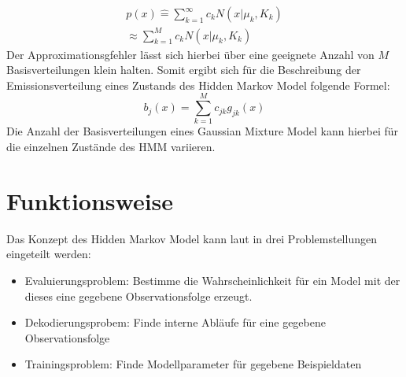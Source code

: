 \begin{multline}
p(x) \hat{=} \sum_{k=1}^\infty c_{k} N(x|\mu_{k},K_{k})\\
\approx \sum_{k=1}^M c_{k} N(x|\mu_{k},K_{k})  
\end{multline}
Der Approximationsgfehler lässt sich hierbei über eine geeignete Anzahl von \(M\) Basisverteilungen klein halten. Somit ergibt sich für die Beschreibung der Emissionsverteilung eines Zustands des Hidden Markov Model folgende Formel:
\begin{equation}
b_{j}(x) = \sum_{k=1}^M c_{jk}g_{jk}(x)
\end{equation}
Die Anzahl der Basisverteilungen eines Gaussian Mixture Model kann hierbei für die einzelnen Zustände des HMM variieren.\\


\section{Funktionsweise}
Das Konzept des Hidden Markov Model kann laut \cite{rabiner} in drei Problemstellungen eingeteilt werden:
\begin{itemize}
  \item Evaluierungsproblem: Bestimme die Wahrscheinlichkeit für ein Model mit
  der dieses eine gegebene Observationsfolge erzeugt.
  \item Dekodierungsprobem: Finde interne Abläufe für eine gegebene Observationsfolge
  \item Trainingsproblem: Finde Modellparameter für gegebene Beispieldaten
\end{itemize}

